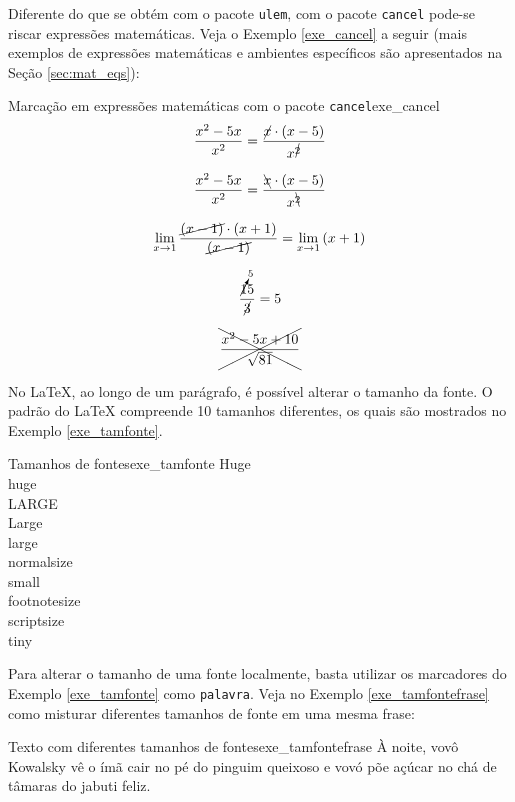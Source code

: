 Diferente do que se obtém com o pacote {\tt ulem}, com o pacote {\tt cancel} pode-se riscar expressões matemáticas. Veja o Exemplo \ref{exe_cancel} a seguir (mais exemplos de expressões matemáticas e ambientes específicos são apresentados na Seção \ref{sec:mat_eqs}):

\begin{texexptitled}[breakable,center lower,enhanced,middle=2mm,]{Marcação em expressões matemáticas com o pacote \texttt{cancel}}{exe_cancel}
$$\frac{x^{2} - 5x}{x^{2}} = \frac{\cancel{x} \cdot (x - 5)}{x^{\cancel{2}}}$$

$$\frac{x^{2} - 5x}{x^{2}} = \frac{\bcancel{x} \cdot (x - 5)}{x^{\bcancel{2}}}$$

$$\lim_{x \to 1}{\frac{\cancel{(x - 1)} \cdot (x + 1)}{\cancel{(x - 1)}}} = \lim_{x \to 1}{(x + 1)}$$

$$\frac{\cancelto{5}15}{{\cancel{3}}} = 5$$

$$\xcancel{\frac{x^{2} - 5x + 10}{\sqrt{81}}}$$
\end{texexptitled}

No \LaTeX{}, ao longo de um parágrafo, é possível alterar o tamanho da fonte. O padrão do \LaTeX{} compreende 10 tamanhos diferentes, os quais são mostrados no Exemplo \ref{exe_tamfonte}.

\begin{texexptitled}[breakable,center lower,enhanced,middle=2mm,listing side text]{Tamanhos de fontes}{exe_tamfonte}
{\Huge Huge}                 \\
{\huge huge}                 \\
{\LARGE LARGE}               \\
{\Large Large}               \\
{\large large}               \\
{\normalsize normalsize}     \\
{\small small}               \\
{\footnotesize footnotesize} \\
{\scriptsize scriptsize}     \\
{\tiny tiny}
\end{texexptitled}

Para alterar o tamanho de uma fonte localmente, basta utilizar os marcadores do Exemplo \ref{exe_tamfonte} como \texttt{{\large palavra}}. Veja no Exemplo \ref{exe_tamfontefrase} como misturar diferentes tamanhos de fonte em uma mesma frase:

\begin{texexptitled}[breakable,center lower,enhanced,middle=2mm]{Texto com diferentes tamanhos de fontes}{exe_tamfontefrase}
À noite, vovô {\large Kowalsky} vê o {\huge ímã} cair no pé do pinguim {\Huge queixoso} e vovó põe açúcar no {\footnotesize chá} de {\tiny tâmaras} do jabuti feliz. 
\end{texexptitled}

